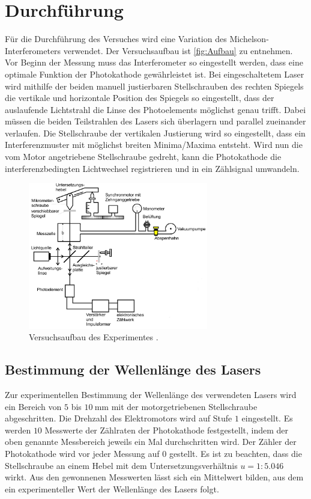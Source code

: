 \section{Durchführung}
\label{sec:Durchführung}
Für die Durchführung des Versuches wird eine Variation des Michelson-Interferometers verwendet. Der Versuchsaufbau ist \autoref{fig:Aufbau} zu entnehmen.
Vor Beginn der Messung muss das Interferometer so eingestellt werden, dass eine optimale Funktion der Photokathode gewährleistet ist.
Bei eingeschaltetem Laser wird mithilfe der beiden manuell justierbaren Stellschrauben des rechten Spiegels die vertikale und horizontale
Position des Spiegels so eingestellt, dass der auslaufende Lichtstrahl die Linse des Photoelements möglichst genau trifft. Dabei müssen die beiden Teilstrahlen
des Lasers sich überlagern und parallel zueinander verlaufen. Die Stellschraube der vertikalen Justierung wird so eingestellt, dass ein Interferenzmuster
mit möglichst breiten Minima/Maxima entsteht. Wird nun die vom Motor angetriebene Stellschraube gedreht, kann die Photokathode die interferenzbedingten
Lichtwechsel registrieren und in ein Zählsignal umwandeln.

\begin{figure}
    \centering
    \includegraphics[width = 0.7\textwidth]{content/Aufbau.png}
    \caption{Versuchsaufbau des Experimentes \cite{v401}.}
    \label{fig:Aufbau}
\end{figure}

\subsection{Bestimmung der Wellenlänge des Lasers}
\label{subsec:Laser_Wellenlaenge}
Zur experimentellen Bestimmung der Wellenlänge des verwendeten Lasers wird ein Bereich von $5$ bis $\qty{10}{\milli\metre}$ mit der motorgetriebenen Stellschraube 
abgeschritten. Die Drehzahl des Elektromotors wird auf Stufe $1$ eingestellt. Es werden $10$ Messwerte der Zählraten der Photokathode festgestellt, indem
der oben genannte Messbereich jeweils ein Mal durchschritten wird. Der Zähler der Photokathode wird vor jeder Messung auf $0$ gestellt.
Es ist zu beachten, dass die Stellschraube an einem Hebel mit dem Untersetzungsverhältnis $u = 1:5.046$ wirkt. 
Aus den gewonnenen Messwerten lässt sich ein Mittelwert bilden, aus dem ein experimenteller Wert der Wellenlänge des Lasers folgt.

